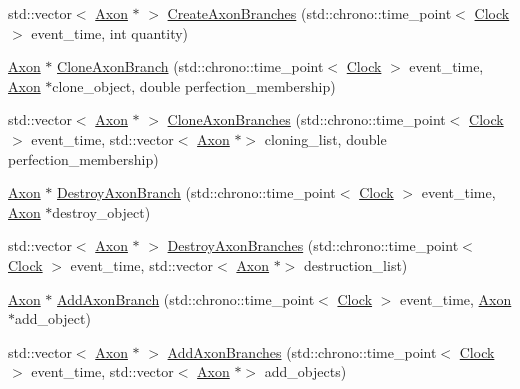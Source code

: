\begin{DoxyCompactItemize}
\item 
std\+::vector$<$ \hyperlink{class_axon}{Axon} $\ast$ $>$ \hyperlink{class_axon_ab0da51c05a0879efdb45c594b68ef8fd}{Create\+Axon\+Branches} (std\+::chrono\+::time\+\_\+point$<$ \hyperlink{universe_8h_a0ef8d951d1ca5ab3cfaf7ab4c7a6fd80}{Clock} $>$ event\+\_\+time, int quantity)
\item 
\hyperlink{class_axon}{Axon} $\ast$ \hyperlink{class_axon_a7720ee66a75e87f4e308b82d1841443a}{Clone\+Axon\+Branch} (std\+::chrono\+::time\+\_\+point$<$ \hyperlink{universe_8h_a0ef8d951d1ca5ab3cfaf7ab4c7a6fd80}{Clock} $>$ event\+\_\+time, \hyperlink{class_axon}{Axon} $\ast$clone\+\_\+object, double perfection\+\_\+membership)
\item 
std\+::vector$<$ \hyperlink{class_axon}{Axon} $\ast$ $>$ \hyperlink{class_axon_af2d6d5bc9ee0cd8ff654a949ef1cc294}{Clone\+Axon\+Branches} (std\+::chrono\+::time\+\_\+point$<$ \hyperlink{universe_8h_a0ef8d951d1ca5ab3cfaf7ab4c7a6fd80}{Clock} $>$ event\+\_\+time, std\+::vector$<$ \hyperlink{class_axon}{Axon} $\ast$$>$ cloning\+\_\+list, double perfection\+\_\+membership)
\item 
\hyperlink{class_axon}{Axon} $\ast$ \hyperlink{class_axon_a6ac580e4565d24c955b0a48d7a8b20e2}{Destroy\+Axon\+Branch} (std\+::chrono\+::time\+\_\+point$<$ \hyperlink{universe_8h_a0ef8d951d1ca5ab3cfaf7ab4c7a6fd80}{Clock} $>$ event\+\_\+time, \hyperlink{class_axon}{Axon} $\ast$destroy\+\_\+object)
\item 
std\+::vector$<$ \hyperlink{class_axon}{Axon} $\ast$ $>$ \hyperlink{class_axon_aa9d26eed8d178527d1995adfad2f67ac}{Destroy\+Axon\+Branches} (std\+::chrono\+::time\+\_\+point$<$ \hyperlink{universe_8h_a0ef8d951d1ca5ab3cfaf7ab4c7a6fd80}{Clock} $>$ event\+\_\+time, std\+::vector$<$ \hyperlink{class_axon}{Axon} $\ast$$>$ destruction\+\_\+list)
\item 
\hyperlink{class_axon}{Axon} $\ast$ \hyperlink{class_axon_a6ed85466115dab46ef71f26a420249ff}{Add\+Axon\+Branch} (std\+::chrono\+::time\+\_\+point$<$ \hyperlink{universe_8h_a0ef8d951d1ca5ab3cfaf7ab4c7a6fd80}{Clock} $>$ event\+\_\+time, \hyperlink{class_axon}{Axon} $\ast$add\+\_\+object)
\item 
std\+::vector$<$ \hyperlink{class_axon}{Axon} $\ast$ $>$ \hyperlink{class_axon_a04969d98c3fbb671cba5daccacffc003}{Add\+Axon\+Branches} (std\+::chrono\+::time\+\_\+point$<$ \hyperlink{universe_8h_a0ef8d951d1ca5ab3cfaf7ab4c7a6fd80}{Clock} $>$ event\+\_\+time, std\+::vector$<$ \hyperlink{class_axon}{Axon} $\ast$$>$ add\+\_\+objects)
\item 
$$
\end{DoxyCompactItemize}
